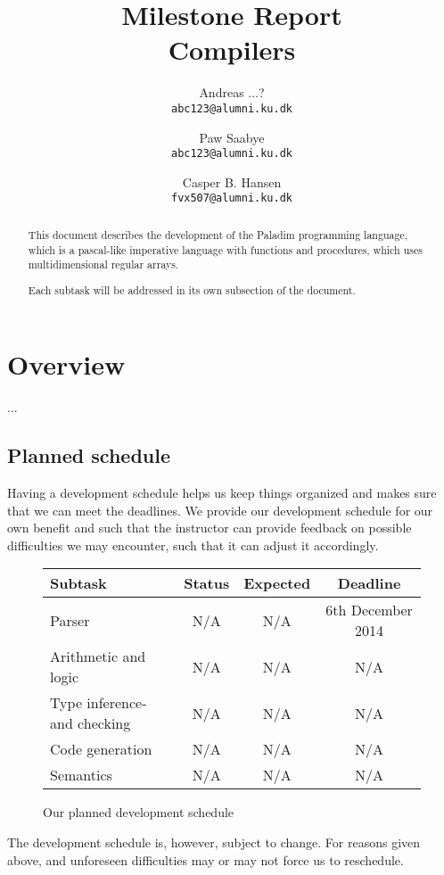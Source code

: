 \documentclass[11pt,a4paper]{article}
\title
{
	{\large Milestone Report}\\
	Compilers
}
\author
{
	Andreas ...?\\
	{\tt abc123@alumni.ku.dk}
	\and
	Paw Saabye\\
	{\tt abc123@alumni.ku.dk}
	\and
	Casper B. Hansen\\
	{\tt fvx507@alumni.ku.dk}
}
\begin{document}
\clearpage
\maketitle
\thispagestyle{empty}
\begin{multicols}{2}
\begin{abstract}
This document describes the development of the Paladim programming language,
which is a pascal-like imperative language with functions and procedures, which
uses multidimensional regular arrays.

Each subtask will be addressed in its own subsection of the document.
\end{abstract}
\vfill
\columnbreak
\tableofcontents
\end{multicols}

\clearpage
\section{Overview}
...

\subsection{Planned schedule}
Having a development schedule helps us keep things organized and makes sure
that we can meet the deadlines. We provide our development schedule for our
own benefit and such that the instructor can provide feedback on possible
difficulties we may encounter, such that it can adjust it accordingly.
\begin{figure}[H]
	\center
	\begin{tabular}{|l|c|c|c|}
		\hline
		{\bf Subtask} & {\bf Status} & {\bf Expected} & {\bf Deadline} \\ \hline
		Parser & N/A & N/A & 6th December 2014 \\ \hline
		Arithmetic and logic & N/A & N/A & N/A \\ \hline
		Type inference- and checking & N/A & N/A & N/A \\ \hline
		Code generation & N/A & N/A & N/A \\ \hline
		Semantics & N/A & N/A & N/A \\ \hline
	\end{tabular}
	\label{table:schedule}
	\caption{Our planned development schedule}
\end{figure}
The development schedule is, however, subject to change. For reasons given
above, and unforeseen difficulties may or may not force us to reschedule.
\end{document}
